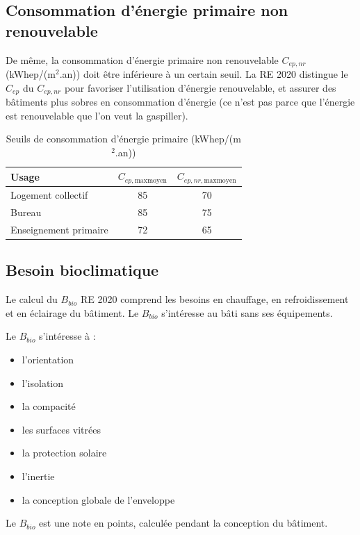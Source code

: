 \subsection*{Consommation d'énergie primaire non renouvelable}
De même, la consommation d'énergie primaire non renouvelable $C_{ep,nr}$ (kWhep/(m$^2$.an)) doit être inférieure à un certain seuil. La RE 2020 distingue le $C_{ep}$ du $C_{ep,nr}$ pour favoriser l'utilisation d'énergie renouvelable, et assurer des bâtiments plus sobres en consommation d'énergie (ce n'est pas parce que l'énergie est renouvelable que l'on veut la gaspiller).

\begin{table}[htbp]
\centering
\caption{Seuils de consommation d'énergie primaire (kWhep/(m$^2$.an))}
\label{tab:cep-seuils}
\begin{tabular}{l|c|c}

\textbf{Usage} & \textbf{$C_{ep,\mathrm{maxmoyen}}$} & \textbf{$C_{ep,nr,\mathrm{maxmoyen}}$} \\
\hline
Logement collectif & 85 & 70 \\
Bureau & 85 & 75 \\
Enseignement primaire & 72 & 65 \\

\end{tabular}
\end{table}

\subsection*{Besoin bioclimatique}
Le calcul du $B_{bio}$ RE 2020 comprend les besoins en chauffage, en refroidissement et en éclairage du bâtiment.
Le $B_{bio}$ s'intéresse au bâti sans ses équipements.

Le $B_{bio}$ s'intéresse à :
\begin{itemize}
  \item l'orientation
  \item l'isolation
  \item la compacité
  \item les surfaces vitrées
  \item la protection solaire
  \item l'inertie
  \item la conception globale de l'enveloppe
\end{itemize}

Le $B_{bio}$ est une note en points, calculée pendant la conception du bâtiment.

